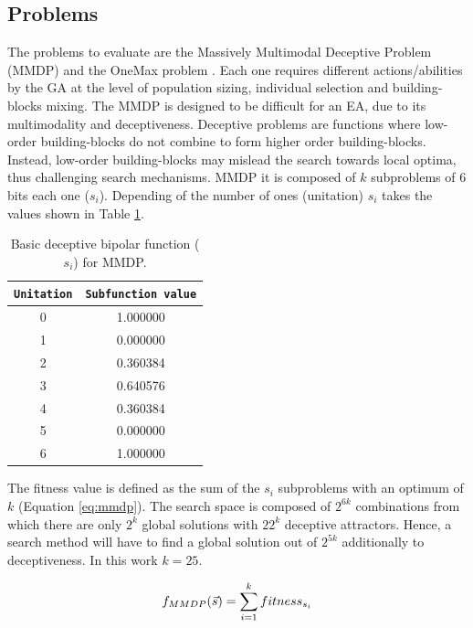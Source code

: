 \documentclass[final,1p,times]{elsarticle}
\begin{document}
\subsection{Problems}
The problems to evaluate are the Massively Multimodal Deceptive Problem (MMDP) \cite{goldberg92massive} and the OneMax problem \cite{ONEMAX}. Each one requires different actions/abilities by the GA at the level of population sizing, individual selection and building-blocks mixing. The MMDP
 is designed to be difficult for an EA, due to
its multimodality and deceptiveness. Deceptive problems are functions where low-order building-blocks do not combine to form higher order building-blocks. Instead, low-order building-blocks may mislead the search towards local optima, thus challenging search mechanisms. MMDP it is composed of $k$ subproblems of 6 bits each one ($s_i$). Depending of
the number of ones (unitation) $s_i$ takes the values shown in Table \ref{table:mmdpvalues}.  

\begin{table}

\centering
{%
\caption{ Basic deceptive bipolar function ($s_i$) for MMDP.}
\label{table:mmdpvalues}
\begin{tabular}{|c|c|}
\hline
\texttt{Unitation}&\texttt{Subfunction value}\\
\hline
0 & 1.000000 \\
\hline
1 & 0.000000 \\
\hline
2 & 0.360384 \\
\hline
3 & 0.640576\\
\hline
4 & 0.360384\\
\hline
5 & 0.000000\\
\hline
6 & 1.000000\\
\hline

\end{tabular}
}


\end{table}



The fitness value is defined as the sum of the $s_i$ subproblems with an optimum of $k$ (Equation \ref{eq:mmdp}).
The search space is composed of $2^{6k}$ combinations from which there
are only $2^k$ global solutions with $22^k$ deceptive
attractors. Hence, a search method will have to find a global solution
out of $2^{5k}$ additionally to deceptiveness. In this work $k=25$. 

\begin{equation}\label{eq:mmdp}
\scriptsize
f_{MMDP}(\vec s)= \sum_{i=1}^{k} fitness_{s_i}
\end{equation}
\end{document}
